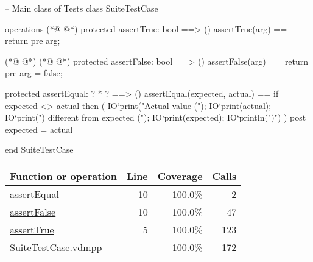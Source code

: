\begin{vdmpp}[breaklines=true]
-- Main class of Tests
class SuiteTestCase

operations
(*@
\label{assertTrue:5}
@*)
  protected assertTrue: bool ==> ()
  assertTrue(arg) ==
    return
  pre arg;
  
(*@
\label{assertEqual:10}
@*)
(*@
\label{assertFalse:10}
@*)
  protected assertFalse: bool ==> ()
  assertFalse(arg) ==
    return
  pre arg = false;
 
  protected assertEqual: ? * ? ==> ()
  assertEqual(expected, actual) ==
    if expected <> actual then (
      IO`print("Actual value (");
      IO`print(actual);
      IO`print(") different from expected (");
      IO`print(expected);
      IO`println(")\n")
    )
  post expected = actual

end SuiteTestCase
\end{vdmpp}
\bigskip
\begin{longtable}{|l|r|r|r|}
\hline
Function or operation & Line & Coverage & Calls \\
\hline
\hline
\hyperref[assertEqual:10]{assertEqual} & 10&100.0\% & 2 \\
\hline
\hyperref[assertFalse:10]{assertFalse} & 10&100.0\% & 47 \\
\hline
\hyperref[assertTrue:5]{assertTrue} & 5&100.0\% & 123 \\
\hline
\hline
SuiteTestCase.vdmpp & & 100.0\% & 172 \\
\hline
\end{longtable}

